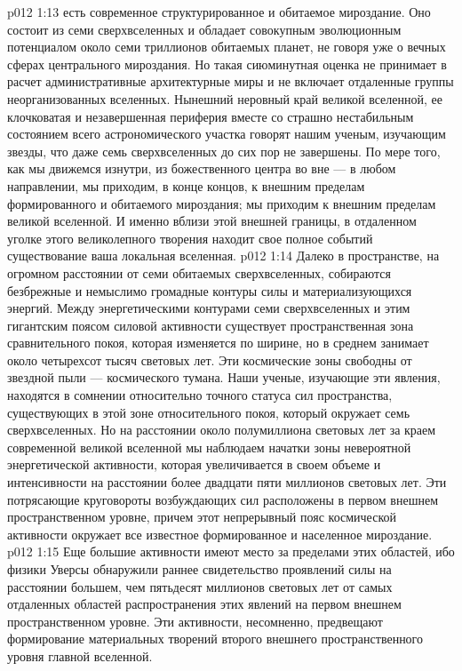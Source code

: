 \vs p012 1:13  есть современное структурированное и обитаемое мироздание. Оно состоит из семи сверхвселенных и обладает совокупным эволюционным потенциалом около семи триллионов обитаемых планет, не говоря уже о вечных сферах центрального мироздания. Но такая сиюминутная оценка не принимает в расчет административные архитектурные миры и не включает отдаленные группы неорганизованных вселенных. Нынешний неровный край великой вселенной, ее клочковатая и незавершенная периферия вместе со страшно нестабильным состоянием всего астрономического участка говорят нашим ученым, изучающим звезды, что даже семь сверхвселенных до сих пор не завершены. По мере того, как мы движемся изнутри, из божественного центра во вне --- в любом направлении, мы приходим, в конце концов, к внешним пределам формированного и обитаемого мироздания; мы приходим к внешним пределам великой вселенной. И именно вблизи этой внешней границы, в отдаленном уголке этого великолепного творения находит свое полное событий существование ваша локальная вселенная.
\vs p012 1:14  Далеко в пространстве, на огромном расстоянии от семи обитаемых сверхвселенных, собираются безбрежные и немыслимо громадные контуры силы и материализующихся энергий. Между энергетическими контурами семи сверхвселенных и этим гигантским поясом силовой активности существует пространственная зона сравнительного покоя, которая изменяется по ширине, но в среднем занимает около четырехсот тысяч световых лет. Эти космические зоны свободны от звездной пыли --- космического тумана. Наши ученые, изучающие эти явления, находятся в сомнении относительно точного статуса сил пространства, существующих в этой зоне относительного покоя, который окружает семь сверхвселенных. Но на расстоянии около полумиллиона световых лет за краем современной великой вселенной мы наблюдаем начатки зоны невероятной энергетической активности, которая увеличивается в своем объеме и интенсивности на расстоянии более двадцати пяти миллионов световых лет. Эти потрясающие круговороты возбуждающих сил расположены в первом внешнем пространственном уровне, причем этот непрерывный пояс космической активности окружает все известное формированное и населенное мироздание.
\vs p012 1:15 Еще большие активности имеют место за пределами этих областей, ибо физики Уверсы обнаружили раннее свидетельство проявлений силы на расстоянии большем, чем пятьдесят миллионов световых лет от самых отдаленных областей распространения этих явлений на первом внешнем пространственном уровне. Эти активности, несомненно, предвещают формирование материальных творений второго внешнего пространственного уровня главной вселенной.
